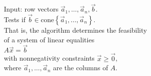 \documentclass[preview]{standalone}
\begin{document}
\begin{center}
Input: row vectors $\vec{a}_1,\ldots,\vec{a}_n, \vec{b}$.\\Tests if $\vec{b}\in\text{cone}\left\lbrace\vec{a}_1,\ldots,\vec{a}_n\right\rbrace$.\\That is, the algorithm determines the feasibility\\of a system of linear equalities\\$A\vec{x}=\vec{b}$\\with nonnegativity constraints $\vec{x}\geq\vec{0}$,\\where $\vec{a}_1,\ldots,\vec{a}_n$ are the columns of $A$.
\end{center}
\end{document}
